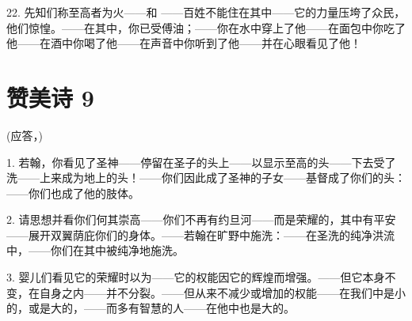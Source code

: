 22. 先知们称至高者为火——\newline{}和 ——\newline{}百姓不能住在其中——\newline{}它的力量压垮了众民，他们惊惶。——\newline{}在其中，你已受傅油；——\newline{}你在水中穿上了他——\newline{}在面包中你吃了他——\newline{}在酒中你喝了他——\newline{}在声音中你听到了他——\newline{}并在心眼看见了他！\par


\section{赞美诗 9}

(应答，)\par

1. 若翰，你看见了圣神——\newline{}停留在圣子的头上——\newline{}以显示至高的头——\newline{}下去受了洗——\newline{}上来成为地上的头！——\newline{}你们因此成了圣神的子女——\newline{}基督成了你们的头：——\newline{}你们也成了他的肢体。\par

2. 请思想并看你们何其崇高——\newline{}你们不再有约旦河——\newline{}而是荣耀的，其中有平安——\newline{}展开双翼荫庇你们的身体。——\newline{}若翰在旷野中施洗：——\newline{}在圣洗的纯净洪流中，——\newline{}你们在其中被纯净地施洗。\par

3. 婴儿们看见它的荣耀时以为——\newline{}它的权能因它的辉煌而增强。——\newline{}但它本身不变，在自身之内——\newline{}并不分裂。——\newline{}但从来不减少或增加的权能——\newline{}在我们中是小的，或是大的，——\newline{}而多有智慧的人——\newline{}在他中也是大的。\par

